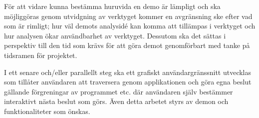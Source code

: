 För att vidare kunna bestämma huruvida en demo är lämpligt och ska möjliggöras
genom utvidgning av verktyget kommer en avgränsning ske efter vad som är rimligt;
hur väl demots analysidé kan komma att tillämpas i verktyget och hur analysen
ökar användbarhet av verktyget. Dessutom ska det sättas i perspektiv till den tid
som krävs för att göra demot genomförbart med tanke på tidsramen för projektet.

I ett senare och/eller parallellt steg ska ett grafiskt användargränssnitt
utvecklas som tillåter användaren att traversera genom applikationen och göra
egna beslut gällande förgreningar av programmet etc. där användaren själv
bestämmer interaktivt nästa beslut som görs. Även detta arbetet styrs av demon
och funktionaliteter som önskas.




%

